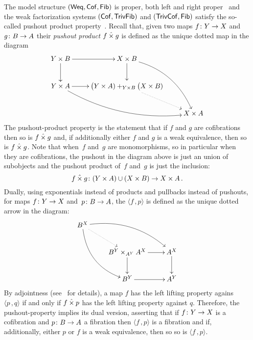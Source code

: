\documentclass[reqno,10pt,a4paper,oneside,draft]{amsart}
\begin{document}
The model structure $(\mathsf{Weq}, \mathsf{Cof}, \mathsf{Fib})$ is proper, \ie both left and right proper~\cite[proposition 2.2.9 and 3.5.2]{henry2019qms}
and the weak factorization systems $(\mathsf{Cof}, \mathsf{TrivFib})$ and $(\mathsf{TrivCof}, \mathsf{Fib})$
satisfy the so-called pushout product property~\cite[proposition 5.1.5 and corollary 5.2.3]{henry2018wms}. Recall that, given two maps $f \colon Y \rightarrow X$ and $g \colon B \rightarrow A$ their \emph{pushout product} $f \mathbin{\hat{\times}} g$ is defined as the unique dotted map in the diagram
\[
\xymatrix{
Y \times B \ar[r] \ar[d] &  X \times B \ar[d] \ar@/^1.5pc/[ddr] \\
Y \times A \ar[r]  \ar@/_1.5pc/[drr] & \displaystyle \big( Y \times A ) +_{Y \times B} \big( X \times B ) \ar@{.>}[dr]  \\
 & & X \times A }
 \]
The pushout-product property is  the statement that  if $f$ and $g$ are cofibrations then so is $f \mathbin{\hat{\times}} g$
and, if additionally either $f$ and $g$ is a weak equivalence, then so is $f \mathbin{\hat{\times}} g$.
Note that when~$f$ and~$g$ are monomorphisms, so in particular when they are cofibrations, the pushout in the diagram above is just an union of subobjects and the pushout product of~$f$ and~$g$ is just the inclusion:
\[  
f \mathbin{\hat{\times}} g \colon (Y \times A) \cup (X \times B) \rightarrow X \times A \, .
\]
Dually, using  exponentials instead of products and pullbacks instead of pushouts, for maps $f \colon Y \rightarrow X$ and~$p \colon B \rightarrow A$, the   $\langle f \, , p \rangle$ is defined as the unique dotted arrow in the diagram:
\[
\xymatrix{
 B^X \ar@{.>}[dr] \ar@/^1.5pc/[drr] \ar@/_1.5pc/[ddr] \\
& B^Y \times_{A^Y} A^X \ar[r] \ar[d] &  A^X \ar[d]  \\
& B^Y \ar[r] & A^Y  \\
 }
 \]
By adjointness (see~\cite{joyal-tierney-segal} for details), a map $f$ has the left lifting property agains $\langle p \, , q \rangle $ if and only if $f \mathbin{\hat{\times}} p$ has the left lifting property against $q$.
Therefore, the pushout-property  implies its dual version, asserting that  if $f \colon Y \to X$ is a cofibration and $p \colon B \to A$ a fibration then $\langle f \, , p \rangle$ is a fibration and if, additionally,  either $p$ or $f$ is a weak equivalence, then so so is $\langle f \, , p \rangle$.

\medskip
\end{document}
